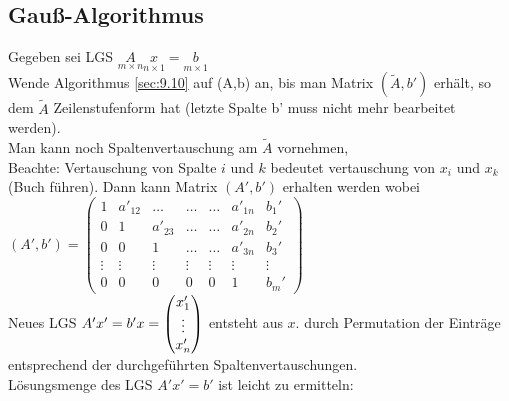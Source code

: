 \subsection{Gau\ss-Algorithmus}\label{sec:9.12}
Gegeben sei LGS $\underset{m\times n}{A}\underset{n\times 1}{x} = \underset{m\times1}{b}$\\
Wende Algorithmus \ref{sec:9.10} auf (A,b) an, bis man Matrix $(\tilde{A},b')$ erhält, so dem $\tilde{A}$ Zeilenstufenform hat (letzte Spalte b' muss nicht mehr bearbeitet werden).\\
Man kann noch Spaltenvertauschung am $\tilde{A}$ vornehmen,\\ Beachte: Vertauschung von Spalte $i$ und $k$ bedeutet vertauschung von $x_i$ und $x_k$ (Buch führen).
Dann kann Matrix $(A',b')$ erhalten werden wobei\\ $(A',b') = 
\begin{pmatrix}
1 & a'_{12}&\ldots&\ldots&\ldots& a'_{1n}& b_1'\\
0 & 1 & a'_{23}&\ldots&\ldots& a'_{2n}& b_2'\\
0 & 0 & 1 & \ldots & \ldots & a'_{3n} & b_3'\\
\vdots & \vdots & \vdots & \vdots & \vdots & \vdots & \vdots\\
0 & 0 & 0 & 0 & 0 & 1 & b_m'
\end{pmatrix}$\\
Neues LGS $A'x'=b'\\
x = \begin{pmatrix}
x_1'\\
\vdots\\
x_n'
\end{pmatrix}$ entsteht aus $x$. durch Permutation der Einträge entsprechend der durchgeführten Spaltenvertauschungen.\\
Lösungsmenge des LGS $A'x'=b'$ ist leicht zu ermitteln:
